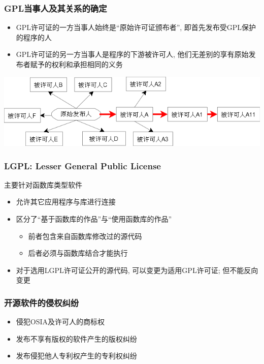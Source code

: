 \documentclass[compress]{beamer}
\begin{document}
\begin{frame}
\frametitle{GPL当事人及其关系的确定}

\begin{itemize}
\item GPL许可证的一方当事人始终是``原始许可证颁布者'', 即首先发布受GPL保护的程序的人
\item GPL许可证的另一方当事人是程序的下游被许可人, 他们无差别的享有原始发布者赋予的权利和承担相同的义务
\end{itemize}

\includegraphics[width=1.0\hsize]{gpled.png}


\end{frame}

\begin{frame}
\frametitle{LGPL: Lesser General Public License}

主要针对函数库类型软件
\begin{itemize}
\item 允许其它应用程序与库进行连接
\item 区分了``基于函数库的作品''与``使用函数库的作品''
    \begin{itemize}
    \item 前者包含来自函数库修改过的源代码
    \item 后者必须与函数库结合才能执行
    \end{itemize}
\item 对于选用LGPL许可证公开的源代码, 可以变更为适用GPL许可证; 但不能反向变更
\end{itemize}


\end{frame}


\begin{frame}
\frametitle{开源软件的侵权纠纷}
\begin{itemize}
\item 侵犯OSIA及许可人的商标权
\item 发布不享有版权的软件产生的版权纠纷
\item 发布侵犯他人专利权产生的专利权纠纷
\end{itemize}

\end{frame}
\end{document}
